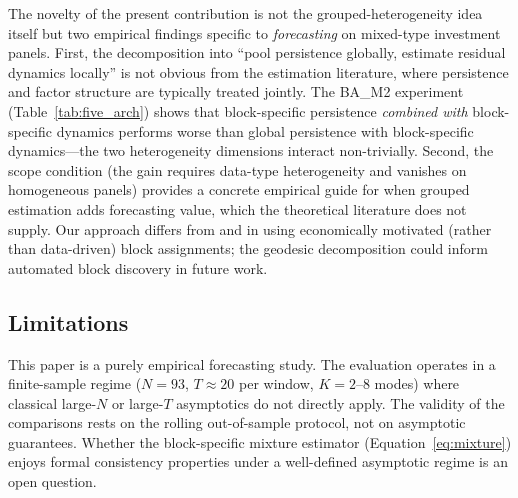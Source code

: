 \documentclass[11pt,a4paper]{article}
\begin{document}
The novelty of the present contribution is not the grouped-heterogeneity idea itself but two empirical findings specific to \emph{forecasting} on mixed-type investment panels. First, the decomposition into ``pool persistence globally, estimate residual dynamics locally'' is not obvious from the estimation literature, where persistence and factor structure are typically treated jointly. The BA\_M2 experiment (Table~\ref{tab:five_arch}) shows that block-specific persistence \emph{combined with} block-specific dynamics performs worse than global persistence with block-specific dynamics---the two heterogeneity dimensions interact non-trivially. Second, the scope condition (the gain requires data-type heterogeneity and vanishes on homogeneous panels) provides a concrete empirical guide for when grouped estimation adds forecasting value, which the theoretical literature does not supply. Our approach differs from \citet{bonhomme2015grouped} and \citet{su2016identifying} in using economically motivated (rather than data-driven) block assignments; the geodesic decomposition could inform automated block discovery in future work.

\subsection{Limitations}

This paper is a purely empirical forecasting study. The evaluation operates in a finite-sample regime ($N = 93$, $T \approx 20$ per window, $K = 2$--$8$ modes) where classical large-$N$ or large-$T$ asymptotics do not directly apply. The validity of the comparisons rests on the rolling out-of-sample protocol, not on asymptotic guarantees. Whether the block-specific mixture estimator (Equation~\ref{eq:mixture}) enjoys formal consistency properties under a well-defined asymptotic regime is an open question.
\end{document}
